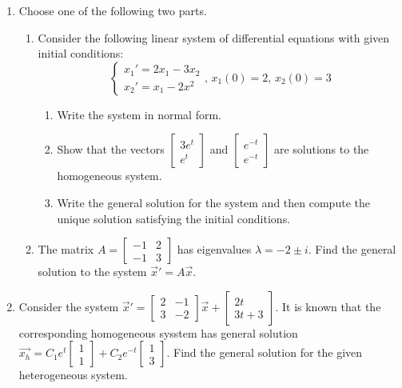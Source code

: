 \begin{enumerate}[label=\arabic*.]
\begin{enumerate}[label=(\alph*)]
		\end{enumerate}
	\item
		Choose one of the following two parts.
		\begin{enumerate}[label=(\alph*)]
			\item 
				Consider the following linear system of differential equations with given initial conditions:
				\begin{equation*}
					\begin{cases}
						x_1' = 2x_1 - 3x_2 \\
						x_2' = x_1 - 2x^2
					\end{cases} \text{, } x_1(0)=2 \text{, } x_2(0)=3
				\end{equation*}
				\begin{enumerate}[label=(\roman*)]
					\item
						Write the system in normal form.
					\item
						Show that the vectors $\begin{bmatrix}
							3e^t \\
							e^t
						\end{bmatrix}$ and $\begin{bmatrix}
							e^{-t} \\
							e^{-t} 
						\end{bmatrix}$ are solutions to the homogeneous system.
					\item
						Write the general solution for the system and then compute the unique solution satisfying the initial conditions.
				\end{enumerate}
			\item
				The matrix $A = \begin{bmatrix}
					-1 & 2 \\
					-1 & 3
				\end{bmatrix}$ has eigenvalues $\lambda = -2 \pm i$.
				Find the general solution to the system $\vec{x}' = A\vec{x}$.
		\end{enumerate}
	\item
		Consider the system
		$\vec{x}' = \begin{bmatrix}
			2 & -1 \\
			3 & -2
		\end{bmatrix}\vec{x} + \begin{bmatrix}
			2t \\
			3t + 3
		\end{bmatrix}$.
		It is known that the corresponding homogeneous sysstem has general solution
		$\vec{x_h} = C_1e^t\begin{bmatrix}
			1 \\
			1
		\end{bmatrix} + C_2e^{-t}\begin{bmatrix}
			1 \\
			3
		\end{bmatrix}$.
		Find the general solution for the given heterogeneous system.
\end{enumerate}